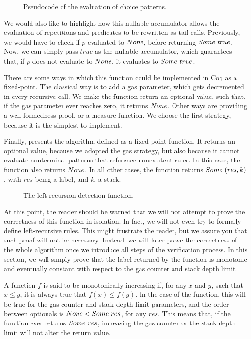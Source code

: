 \begin{figure}
    \centering
    
    \caption{Pseudocode of the evaluation of choice patterns.}
    \label{fig:evalchoice}
\end{figure}

We would also like to highlight
how this nullable accumulator allows
the evaluation of repetitions and predicates
to be rewritten as tail calls.
Previously,
we would have to check if $p$ evaluated to $None$,
before returning $Some\ true$.
Now, we can simply pass $true$ as the nullable accumulator,
which guarantees that, if $p$ does not evaluate to $None$,
it evaluates to $Some\ true$.

There are some ways in which this function
could be implemented in Coq as a fixed-point.
The classical way is to add a gas parameter,
which gets decremented in every recursive call.
We make the function return an optional value,
such that, if the gas parameter ever reaches zero,
it returns $None$.
Other ways are providing a well-formedness proof,
or a measure function.
We choose the first strategy,
because it is the simplest to implement.

Finally,
 presents the algorithm
defined as a fixed-point function.
It returns an optional value,
because we adopted the gas strategy,
but also because it cannot evaluate
nonterminal patterns that
reference nonexistent rules.
In this case,
the function also returns $None$.
In all other cases,
the function returns $Some\ (res, k)$,
with $res$ being a label, and $k$, a stack.
\begin{figure}
    \centering
    
    \caption{The left recursion detection function.}
    \label{fig:vr-function}
\end{figure}

At this point,
the reader should be warned that
we will not attempt to prove the correctness
of this function in isolation.
In fact, we will not even try to formally
define left-recursive rules.
This might frustrate the reader,
but we assure you that such proof will not be necessary.
Instead,
we will later prove the correctness of the whole algorithm
once we introduce all steps of the verification process.
In this section,
we will simply prove
that the label returned by the function
is monotonic and eventually constant
with respect to the gas counter and stack depth limit.

A function $f$ is said to be monotonically increasing
if, for any $x$ and $y$, such that $x \le y$,
it is always true that $f(x) \le f(y)$.
In the case of the \textit{\verifyrulename{}} function,
this will be true for the gas counter and stack depth limit parameters,
and the order between optionals is $None < Some\ res$, for any $res$.
This means that, if the function ever returns $Some\ res$,
increasing the gas counter or the stack depth limit
will not alter the return value.

